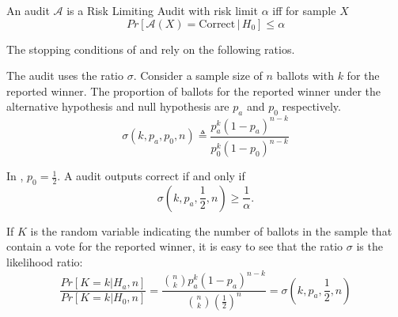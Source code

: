 \begin{definition}
An audit $\mathcal{A}$ is a Risk Limiting Audit with 
risk limit $\alpha$ iff for sample $X$
$$
Pr[\mathcal{A}(X) 
= \text{Correct} \,|\, H_0]\le \alpha
$$
\end{definition}

The stopping conditions of \BRAVO and \Minerva rely on the following ratios.

\begin{definition} \label{def:bravo-ratio} The \BRAVO audit uses the ratio $\sigma$. Consider a sample size of $n$ ballots with $k$ for the reported winner. The proportion of ballots for the reported winner under the alternative hypothesis and null hypothesis are $p_a$ and $p_0$ respectively.
\begin{equation}
    \sigma(k, p_a, p_0, n) \triangleq \frac{p_a^{k} (1-p_a)^{n-k}}{p_0^{k} (1-p_0)^{n-k}} 
    \label{eqn:bravoratio}
\end{equation}
\end{definition}

In \BRAVO, $p_0=\frac{1}{2}$. A \BRAVO audit outputs correct if and only if
$$\sigma(k,p_a,\frac{1}{2},n)\ge \frac{1}{\alpha}.$$

If $K$ is the random variable indicating the number of ballots in the sample that contain a vote for the reported winner, it is easy to see that the ratio $\sigma$ is the likelihood ratio:
$$
\frac{Pr[K=k|H_a,n]}{Pr[K=k|H_0,n]}= \frac{\binom{n}{k}p_a^{k} (1-p_a)^{n-k}}{\binom{n}{k}(\frac{1}{2})^n} =\sigma(k, p_a, \frac{1}{2}, n)
$$

\begin{comment}
\begin{definition}[$(\alpha,p)$-\BRAVO ]\label{def:bravo}  An audit $\mathcal{A}$ is the \B~$(\alpha, p)$-\BRAVO audit iff the following stopping condition is tested at each ballot draw. If the sample $X$ is of size $n$ and has $k$ ballots for the winner,  
\begin{equation}
    \mathcal{A}(X) =  \left\{ \begin{array}{ll} \text{Correct} & ~\sigma(k, p, \frac{1}{2}, n) 
        \geq \frac{1}{\alpha}\\
        Undetermined & ~else 
    \end{array}
    \right .
    \label{eqn:bravo}
\end{equation}
\end{definition}
\end{comment}

